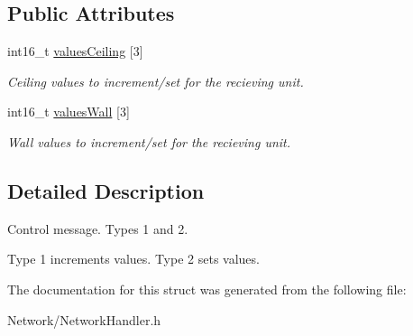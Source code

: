 \subsection*{Public Attributes}
\begin{DoxyCompactItemize}
\item 
\mbox{\label{structNetworkHandler_1_1ControlMessage_ac24f313f593e8fe3406f9ae54201513a}} 
int16\+\_\+t \mbox{\hyperlink{structNetworkHandler_1_1ControlMessage_ac24f313f593e8fe3406f9ae54201513a}{values\+Ceiling}} \mbox{[}3\mbox{]}
\begin{DoxyCompactList}\small\item\em Ceiling values to increment/set for the recieving unit. \end{DoxyCompactList}\item 
\mbox{\label{structNetworkHandler_1_1ControlMessage_a6d54372eb881b32e6face646afaaea86}} 
int16\+\_\+t \mbox{\hyperlink{structNetworkHandler_1_1ControlMessage_a6d54372eb881b32e6face646afaaea86}{values\+Wall}} \mbox{[}3\mbox{]}
\begin{DoxyCompactList}\small\item\em Wall values to increment/set for the recieving unit. \end{DoxyCompactList}\end{DoxyCompactItemize}


\subsection{Detailed Description}
Control message. Types 1 and 2. 

Type 1 increments values. Type 2 sets values. 

The documentation for this struct was generated from the following file\+:\begin{DoxyCompactItemize}
\item 
Network/Network\+Handler.\+h\end{DoxyCompactItemize}
